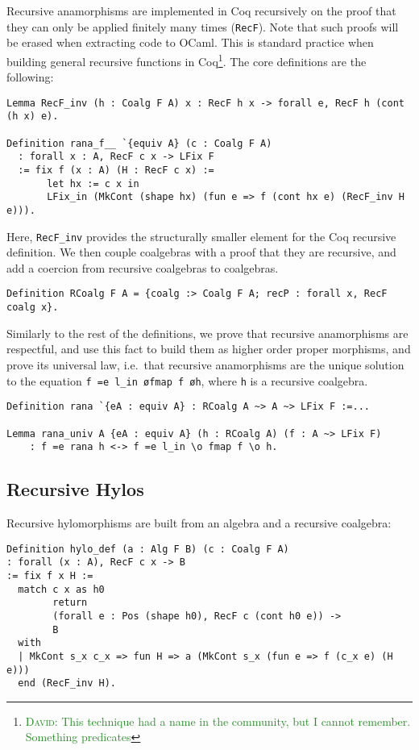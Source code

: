 \documentclass[a4paper, UKenglish, cleveref, autoref, thm-restate]{lipics-v2021}
\newcommand{\dcas}[1]{\textcolor{ForestGreen}{\textsc{David}: #1}}
\begin{document}
Recursive anamorphisms are implemented in Coq recursively on the proof that
they can only be applied finitely many times (\texttt{RecF}).  Note
that such proofs will be erased when extracting code to OCaml. This is standard
practice when building general recursive functions in Coq\footnote{\dcas{This
technique had a name in the community, but I cannot remember. Something
predicates}}. The core definitions are the following:
\begin{verbatim}
Lemma RecF_inv (h : Coalg F A) x : RecF h x -> forall e, RecF h (cont (h x) e).

Definition rana_f__ `{equiv A} (c : Coalg F A)
  : forall x : A, RecF c x -> LFix F
  := fix f (x : A) (H : RecF c x) :=
       let hx := c x in
       LFix_in (MkCont (shape hx) (fun e => f (cont hx e) (RecF_inv H e))).
\end{verbatim}
Here, \texttt{RecF_inv} provides the structurally smaller element for
the Coq recursive definition. We then couple coalgebras with a proof that they
are recursive, and add a coercion from recursive coalgebras to coalgebras.
\begin{verbatim}
Definition RCoalg F A = {coalg :> Coalg F A; recP : forall x, RecF coalg x}.
\end{verbatim}
Similarly to the rest of the definitions, we prove that recursive anamorphisms
are respectful, and use this fact to build them as higher order proper
morphisms, and prove its universal law, i.e.\ that recursive anamorphisms are
the unique solution to the equation 
\texttt{f =e l_in \o fmap f \o h},
where \texttt{h} is a recursive coalgebra.
\begin{verbatim}
Definition rana `{eA : equiv A} : RCoalg A ~> A ~> LFix F :=...

Lemma rana_univ A {eA : equiv A} (h : RCoalg A) (f : A ~> LFix F)
    : f =e rana h <-> f =e l_in \o fmap f \o h.
\end{verbatim}

\subsection{Recursive Hylos}

Recursive hylomorphisms are built from an algebra and a recursive coalgebra:
\begin{verbatim}
Definition hylo_def (a : Alg F B) (c : Coalg F A)
: forall (x : A), RecF c x -> B
:= fix f x H :=
  match c x as h0
        return
        (forall e : Pos (shape h0), RecF c (cont h0 e)) ->
        B
  with
  | MkCont s_x c_x => fun H => a (MkCont s_x (fun e => f (c_x e) (H e)))
  end (RecF_inv H).
\end{verbatim}
\end{document}
